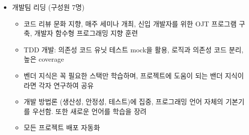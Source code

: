 \begin{itemize}
\begin{itemize}[label=$\star$]
\begin{itemize}
		            \end{itemize}
	      \end{itemize}
	\item 개발팀 리딩 (구성원 7명)
	      \begin{itemize}[label=$\star$]
		      \item 코드 리뷰 문화 지향, 매주 세미나 개최, 신입 개발자를 위한 OJT 프로그램 구축, 개발자 함수형 프로그래밍 지향 훈련
		      \item TDD 개발: 의존성 코드 유닛 테스트 mock을 활용, 로직과 의존성 코드 분리, 높은 coverage
		      \item 벤더 지식은 꼭 필요한 스택만 학습하며, 프로젝트에 도움이 되는 밴더 지식이라면 각자 연구하여 공유
		      \item 개발 방법론 (생산성, 안정성, 테스트)에 집중, 프로그래밍 언어 자체의 기본기를 우선함. 또한 새로운 언어를 학습을 장려
		      \item 모든 프로젝트 배포 자동화
	      \end{itemize}
\end{itemize}

\divider

